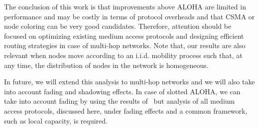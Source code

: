 \documentclass[12pt,english]{article}
\begin{document}
The conclusion of this work is that improvements above ALOHA are limited in performance and may be costly in terms of protocol overheads and that CSMA or node coloring can be very good candidates. Therefore, attention should be focused on optimizing existing medium access protocols and designing efficient routing strategies in case of multi-hop networks. Note that, our results are also relevant when nodes move according to an i.i.d. mobility process such that, at any time, the distribution of nodes in the network is homogeneous.

In future, we will extend this analysis to multi-hop networks and we will also take into account fading and shadowing effects. In case of slotted ALOHA, we can take into account fading by using the results of~\cite{Jacquet:2009} but analysis of all medium access protocols, discussed here, under fading effects and a common framework, such as local capacity, is required.



\end{document}
